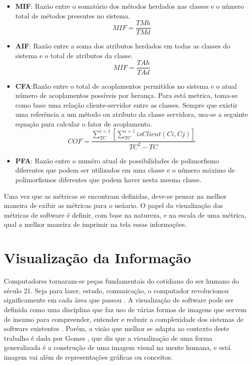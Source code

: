 \begin{itemize}
\item \textbf{MIF}: Razão entre o somatório dos métodos herdados nas classes e o número total de métodos presentes no sistema.
\begin{equation}
MIF = \frac{TMh}{TMd}
\end{equation}
\item \textbf{AIF}: Razão entre a soma dos atributos herdados em todas as classes do sistema e o total de atributos da classe.
\begin{equation}
MIF = \frac{TAh}{TAd}
\end{equation}
\item \textbf{CFA}:Razão entre o total de acoplamentos permitídos no sistema e o atual número de acoplamentos possíveis por herança. Para está metrica, toma-se como base uma relação cliente-servidor entre as classes. Sempre que existir uma referência a um método ou atributo da classe servidora, usa-se a seguinte equação para calcular o fator de acoplamento.
\begin{equation}
COF = \frac{\sum_{TC}^{i=1}[\sum_{TC}^{i=1}isClient(Ci,Cj)]}{TC^2-TC}
\end{equation}
\item \textbf{PFA}: Razão entre o numéro atual de possibilidades de polimorfismo diferentes que podem ser utilizados em uma classe e o número máximo de polimorfismos diferentes que podem haver nesta mesma classe.
\end{itemize}

Uma vez que as métricas se encontram definidas, deve-se pensar na melhor maneira de exibir as métricas para o usúario. O papel da visualização das métricas de software é definir, com base na natureza, e na escala de uma métrica, qual a melhor maneira de imprimir na tela essas informações.

\section{Visualização da Informação}
Computadores tornaram-se peças fundamentais do cotidiano do ser humano do século 21. Seja para lazer, estudo, comunicação, o computador revolucionou significamente em cada área que passou \cite{hasan_humancomputer_2014}.
A visualização de software pode ser definida como uma disciplina que faz uso de várias formas de imagens que servem de insumo para compreender, entender e reduzir a complexidade dos sistemas de software existentes \cite{gracanin_software_2005}. Porém, a visão que melhor se adapta ao contexto deste trabalho é dada por Gomes \cite{gomes_percepcao_2011}, que diz que a visualização de uma forma generalizada é a construção de uma imagem visual na mente humana, e está imagem vai além de representações gráficas ou conceitos.

